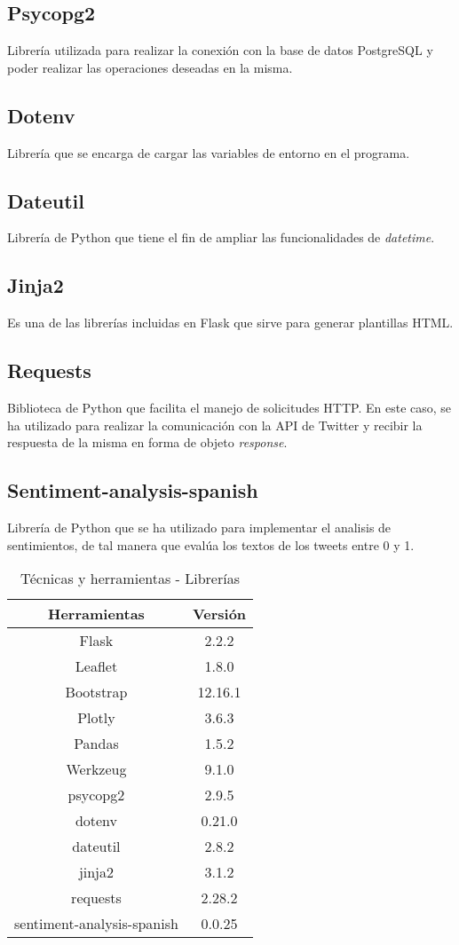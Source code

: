 \subsection{Psycopg2}
Librería utilizada para realizar la conexión con la base de datos PostgreSQL y poder realizar las operaciones deseadas en la misma.
\subsection{Dotenv}
Librería que se encarga de cargar las variables de entorno en el programa.
\subsection{Dateutil}
Librería de Python que tiene el fin de ampliar las funcionalidades de \textit{datetime}.
\subsection{Jinja2}
Es una de las librerías incluidas en Flask que sirve para generar plantillas HTML.
\subsection{Requests}
Biblioteca de Python que facilita el manejo de solicitudes HTTP. En este caso, se ha utilizado para realizar la comunicación con la API de Twitter y recibir la respuesta de la misma en forma de objeto \textit{response}.
\subsection{Sentiment-analysis-spanish}
Librería de Python que se ha utilizado para implementar el analisis de sentimientos, de tal manera que evalúa los textos de los tweets entre 0 y 1.
\begin{table}[ht!]
    \centering
    \begin{tabular}{c|c}
         \hline
         \textbf{Herramientas} & \textbf{Versión} \\\hline
         {Flask} &{2.2.2}  \\\hline
         {Leaflet} &{1.8.0} \\\hline
         {Bootstrap} &{12.16.1}\\\hline 
         {Plotly} &{3.6.3}\\\hline
         {Pandas} &{1.5.2} \\\hline 
         {Werkzeug} &{9.1.0}  \\\hline
         {psycopg2} &{2.9.5}\\\hline 
         {dotenv} &{0.21.0} \\\hline 
         {dateutil} &{2.8.2} \\\hline 
         {jinja2} &{3.1.2} \\\hline 
         {requests} &{2.28.2} \\\hline
         {sentiment-analysis-spanish}&{0.0.25}\\\hline
    \end{tabular}
    \caption{Técnicas y herramientas - Librerías}
    \label{Técnicas y herramientas - Librerías}
\end{table}